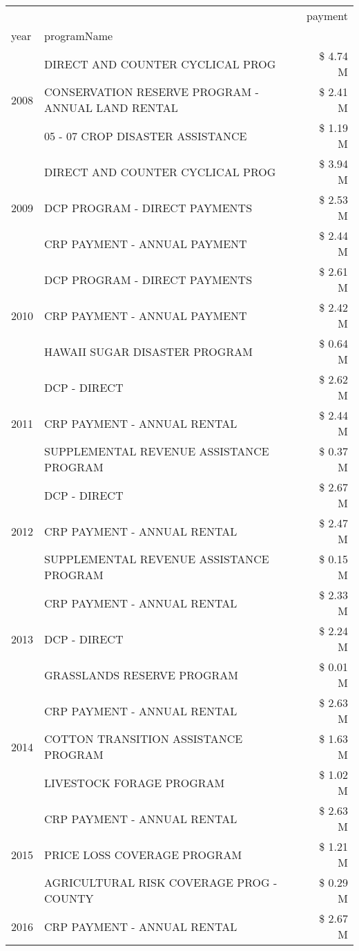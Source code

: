 \begin{tabular}{llr}
\toprule
 &  & payment \\
year & programName &  \\
\midrule
\multirow[t]{3}{*}{2008} & DIRECT AND COUNTER CYCLICAL PROG & \$ 4.74 M \\
 & CONSERVATION RESERVE PROGRAM - ANNUAL LAND RENTAL & \$ 2.41 M \\
 & 05 - 07 CROP DISASTER ASSISTANCE & \$ 1.19 M \\
\cline{1-3}
\multirow[t]{3}{*}{2009} & DIRECT AND COUNTER CYCLICAL PROG & \$ 3.94 M \\
 & DCP PROGRAM - DIRECT PAYMENTS & \$ 2.53 M \\
 & CRP PAYMENT - ANNUAL PAYMENT & \$ 2.44 M \\
\cline{1-3}
\multirow[t]{3}{*}{2010} & DCP PROGRAM - DIRECT PAYMENTS & \$ 2.61 M \\
 & CRP PAYMENT - ANNUAL PAYMENT & \$ 2.42 M \\
 & HAWAII SUGAR DISASTER PROGRAM & \$ 0.64 M \\
\cline{1-3}
\multirow[t]{3}{*}{2011} & DCP - DIRECT & \$ 2.62 M \\
 & CRP PAYMENT - ANNUAL RENTAL & \$ 2.44 M \\
 & SUPPLEMENTAL REVENUE ASSISTANCE PROGRAM & \$ 0.37 M \\
\cline{1-3}
\multirow[t]{3}{*}{2012} & DCP - DIRECT & \$ 2.67 M \\
 & CRP PAYMENT - ANNUAL RENTAL & \$ 2.47 M \\
 & SUPPLEMENTAL REVENUE ASSISTANCE PROGRAM & \$ 0.15 M \\
\cline{1-3}
\multirow[t]{3}{*}{2013} & CRP PAYMENT - ANNUAL RENTAL & \$ 2.33 M \\
 & DCP - DIRECT & \$ 2.24 M \\
 & GRASSLANDS RESERVE PROGRAM & \$ 0.01 M \\
\cline{1-3}
\multirow[t]{3}{*}{2014} & CRP PAYMENT - ANNUAL RENTAL & \$ 2.63 M \\
 & COTTON TRANSITION ASSISTANCE PROGRAM & \$ 1.63 M \\
 & LIVESTOCK FORAGE PROGRAM & \$ 1.02 M \\
\cline{1-3}
\multirow[t]{3}{*}{2015} & CRP PAYMENT - ANNUAL RENTAL & \$ 2.63 M \\
 & PRICE LOSS COVERAGE PROGRAM & \$ 1.21 M \\
 & AGRICULTURAL RISK COVERAGE PROG - COUNTY & \$ 0.29 M \\
\cline{1-3}
\multirow[t]{3}{*}{2016} & CRP PAYMENT - ANNUAL RENTAL & \$ 2.67 M \\

\end{tabular}
